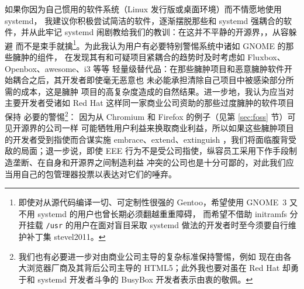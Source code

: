 如果你因为自己惯用的软件系统（Linux 发行版或桌面环境）而不情愿地使用 systemd，
我建议你积极尝试简洁的软件，逐渐摆脱那些和 systemd 强耦合的软件，并从此牢记
systemd 闹剧教给我们的教训：在这并不平静的开源界，，从容躲避
而不是束手就擒\footnote{即使对从源代码编译一切、可定制性很强的 Gentoo，希望使用
GNOME~3 又不用 systemd 的用户也曾长期必须翻越重重障碍，
而希望不借助 initramfs 分开挂载 \texttt{/usr} 的用户在面对盲目采取 systemd
做法的开发者时至今须要自行维护补丁集\cupercite%
{stevel2011}。}。为此我认为用户有必要特别警惕系统中诸如 GNOME 的那些臃肿的组件，
在发现其有和可疑项目紧耦合的趋势时及时考虑如 Fluxbox、Openbox、awesome、i3 等等
轻量级替代品：在那些臃肿项目和恶意臃肿软件开始耦合之后，其开发者即使毫无恶意也
未必能承担清除自己项目中被感染部分所需的成本，这是臃肿
项目的高复杂度造成的自然结果。进一步地，我认为应当对主要开发者受诸如 Red Hat
这样同一家商业公司资助的那些过度臃肿的软件项目保持
必要的警惕\footnote{我们也有必要进一步对由商业公司主导的复杂标准保持警惕，例如
现在由各大浏览器厂商及其背后公司主导的 HTML5；此外我也要对虽在 Red Hat 却勇于和
systemd 开发者斗争的 BusyBox 开发者表示由衷的敬佩。}：
因为从 Chromium 和 Firefox 的例子（见第 \ref{sec:foss} 节）可见开源界的公司一样
可能牺牲用户利益来换取商业利益，所以如果这些臃肿项目的开发者受到指使而合谋实施
embrace、extend、extinguish ，我们将面临腹背受敌的局面；退一步说，即使 EEE
行为不是受公司指使，纵容员工采用下作手段制造垄断、在自身和开源界之间制造利益
冲突的公司也是十分可鄙的，对此我们应当用自己的包管理器投票以表达对它们的唾弃。

